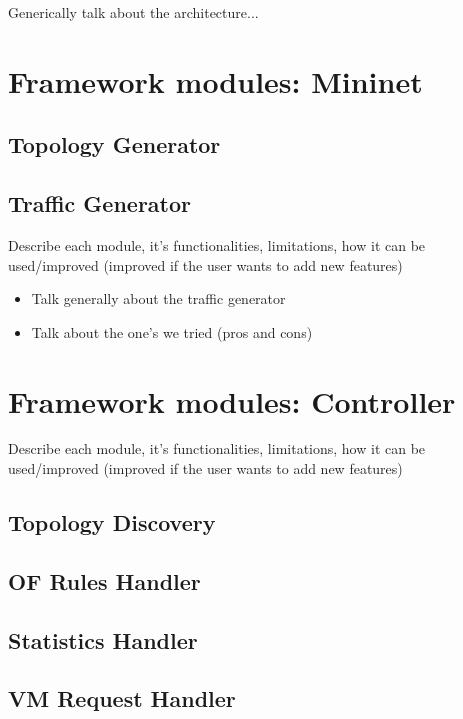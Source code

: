 \documentclass[12pt,english]{book}
\begin{document}
Generically talk about the architecture...


\section{Framework modules: Mininet}

\subsection{Topology Generator}

\subsection{Traffic Generator}

Describe each module, it's functionalities, limitations, how it can be used/improved (improved if the user wants to add new features)

\begin{itemize}
	\item Talk generally about the traffic generator
	\item Talk about the one's we tried (pros and cons)
\end{itemize}

\newpage


\section{Framework modules: Controller}

Describe each module, it's functionalities, limitations, how it can be used/improved (improved if the user wants to add new features)

\subsection{Topology Discovery}

\subsection{OF Rules Handler}

\subsection{Statistics Handler}

\subsection{VM Request Handler}
\end{document}
